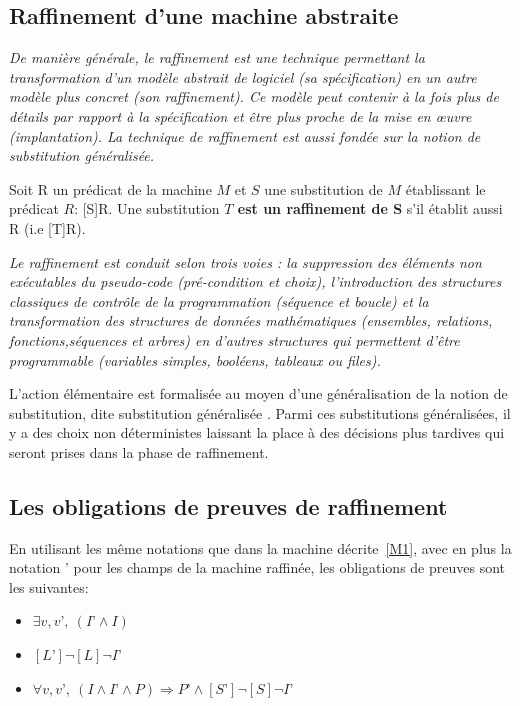 \documentclass[10pt,a4paper]{article}
\begin{document}
{\subsection{Raffinement d'une machine abstraite}
\emph{De manière générale, le raffinement est une technique permettant la transformation d'un modèle abstrait de logiciel (sa spécification) en un autre modèle plus concret (son raffinement). Ce modèle peut contenir à la fois plus de détails par rapport à la spécification et être plus proche de la mise en œuvre (implantation). La technique de raffinement est aussi fondée sur la notion de substitution généralisée.}\cite{dossierTechnique}

Soit R un prédicat de la machine $M$ et $S$ une substitution de $M$ établissant le prédicat $R$: [S]R.
Une substitution \textbf{$T$ est un raffinement de S} s'il établit aussi R (i.e [T]R).

\emph{Le raffinement est conduit selon trois voies : la suppression des éléments non exécutables du pseudo-code (pré-condition et choix), l'introduction des structures classiques de contrôle de la programmation (séquence et boucle) et la transformation des structures de données mathématiques (ensembles, relations, fonctions,séquences et arbres) en d’autres structures qui permettent d’être programmable (variables simples, booléens, tableaux ou files).}\cite{dossierTechnique}

L’action élémentaire est formalisée au moyen d’une généralisation de la notion de substitution, dite \og substitution généralisée \fg. Parmi ces substitutions généralisées,
il y a des choix non déterministes laissant la place à des décisions plus tardives qui seront prises dans la phase de raffinement.

\subsection{Les obligations de preuves de raffinement}

En utilisant les même notations que dans la machine décrite~\cref{M1}, avec en plus la notation ' pour les champs de la machine raffinée, les obligations de preuves sont les suivantes:
\begin{itemize}
\item $\exists v,v’,~ (I’ \wedge I) $
\item $[L’]\lnot[L]\lnot I’$
\item $\forall v,v’,~ (I \wedge I’ \wedge P) \Rightarrow P’ \wedge [S’]\lnot[S]\lnot I’$
\end{itemize}

}
\end{document}
